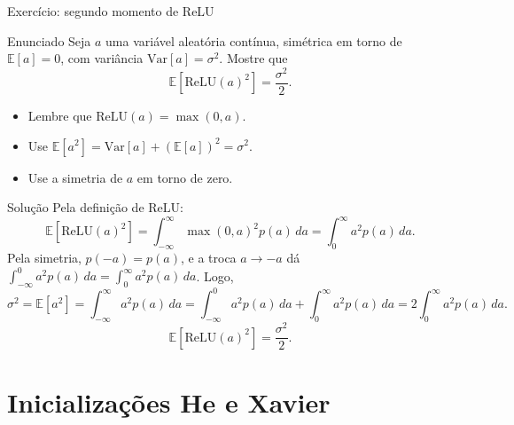 \documentclass[aspectratio=169,xcolor=dvipsnames]{beamer}
\begin{document}

  \begin{frame}{Exercício: segundo momento de ReLU}
    \begin{exampleblock}{Enunciado}
      Seja $a$ uma variável aleatória contínua, simétrica em torno de $\mathbb{E}[a]=0$, com
      variância $\mathrm{Var}[a] = \sigma^2$. Mostre que
      \[
        \mathbb{E}\!\left[\mathrm{ReLU}(a)^2\right] = \frac{\sigma^2}{2}.
      \]
    \end{exampleblock}
    \vfill
    \begin{itemize}
      \item Lembre que $\mathrm{ReLU}(a) = \max(0,a)$.
      \item Use $\mathbb{E}[a^2] = \mathrm{Var}[a] + (\mathbb{E}[a])^2 = \sigma^2$.
      \item Use a simetria de $a$ em torno de zero.
    \end{itemize}
  \end{frame}

  \begin{frame}{Solução}
    Pela definição de $\mathrm{ReLU}$:
    \[
      \mathbb{E}[\mathrm{ReLU}(a)^2] = \int_{-\infty}^{\infty} \max(0,a)^2 p(a)\,da
        = \int_{0}^{\infty} a^2 p(a)\,da.
    \]
    Pela simetria, $p(-a)=p(a)$, e a troca $a\to -a$ dá
    $\int_{-\infty}^{0} a^2 p(a)\,da = \int_{0}^{\infty} a^2 p(a)\,da$. Logo,
    \[
      \sigma^2 = \mathbb{E}[a^2]
        = \int_{-\infty}^{\infty} a^2 p(a)\,da
        = \int_{-\infty}^{0} a^2 p(a)\,da + \int_{0}^{\infty} a^2 p(a)\,da
        = 2 \int_{0}^{\infty} a^2 p(a)\,da.
    \]
    \[
      \boxed{\mathbb{E}[\mathrm{ReLU}(a)^2] = \frac{\sigma^2}{2}.}
    \]
  \end{frame}

  \section{Inicializações He e Xavier}
\end{document}
